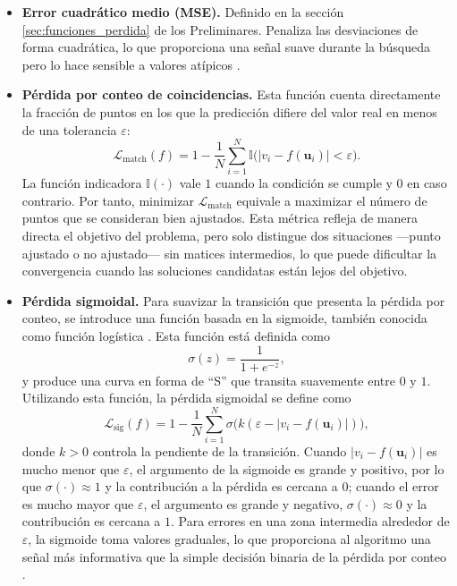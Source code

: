\documentclass[12pt,a4paper]{article} \usepackage[utf8]{inputenc} \usepackage[spanish]{babel} \usepackage{amsmath, amssymb, amsthm} \usepackage{bm} \usepackage{float} \usepackage{longtable} \usepackage[hidelinks]{hyperref}
\begin{document}
\begin{itemize}
    \item \textbf{Error cuadrático medio (MSE).} Definido en la sección
    \ref{sec:funciones_perdida} de los Preliminares. Penaliza las
    desviaciones de forma cuadrática, lo que proporciona una señal suave
    durante la búsqueda pero lo hace sensible a valores atípicos
    \cite{hastie2009elements}.

    \item \textbf{Pérdida por conteo de coincidencias.} Esta función
    cuenta directamente la fracción de puntos en los que la predicción
    difiere del valor real en menos de una tolerancia \(\varepsilon\):
    \[
    \mathcal{L}_{\text{match}}(f) = 1 - \frac{1}{N} \sum_{i=1}^{N}
    \mathbb{I}\bigl( |v_i - f(\mathbf{u}_i)| < \varepsilon \bigr).
    \]
    La función indicadora \(\mathbb{I}(\cdot)\) vale \(1\) cuando la
    condición se cumple y \(0\) en caso contrario. Por tanto, minimizar
    \(\mathcal{L}_{\text{match}}\) equivale a maximizar el número de
    puntos que se consideran bien ajustados. Esta métrica refleja de
    manera directa el objetivo del problema, pero solo distingue dos
    situaciones —punto ajustado o no ajustado— sin matices intermedios,
    lo que puede dificultar la convergencia cuando las soluciones
    candidatas están lejos del objetivo.

    \item \textbf{Pérdida sigmoidal.} Para suavizar la transición que
    presenta la pérdida por conteo, se introduce una función basada en
    la sigmoide, también conocida como función logística
    \cite{bishop2006pattern}. Esta función está definida como
    \begin{equation}
        \sigma(z) = \frac{1}{1 + e^{-z}},
    \end{equation}
    y produce una curva en forma de ``S'' que transita suavemente entre
    \(0\) y \(1\). Utilizando esta función, la pérdida sigmoidal se
    define como
    \[
    \mathcal{L}_{\text{sig}}(f) = 1 - \frac{1}{N} \sum_{i=1}^{N}
    \sigma\bigl( k (\varepsilon - |v_i - f(\mathbf{u}_i)|) \bigr),
    \]
    donde \(k > 0\) controla la pendiente de la transición. Cuando
    \(|v_i - f(\mathbf{u}_i)|\) es mucho menor que \(\varepsilon\), el
    argumento de la sigmoide es grande y positivo, por lo que
    \(\sigma(\cdot) \approx 1\) y la contribución a la pérdida es
    cercana a \(0\); cuando el error es mucho mayor que \(\varepsilon\),
    el argumento es grande y negativo, \(\sigma(\cdot) \approx 0\) y la
    contribución es cercana a \(1\). Para errores en una zona intermedia
    alrededor de \(\varepsilon\), la sigmoide toma valores graduales, lo
    que proporciona al algoritmo una señal más informativa que la simple
    decisión binaria de la pérdida por conteo \cite{cranmer2023pysr}.
\end{itemize}
\end{document}
